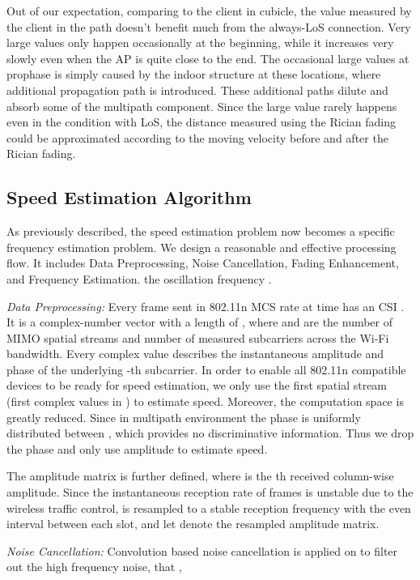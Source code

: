 Out of our expectation, comparing to the client in cubicle, the  value
 measured by the client in the path doesn't benefit much from the
 always-LoS connection.
Very large  values only happen occasionally at the
 beginning, while it increases very slowly even when the AP is quite
 close to the end.
The occasional large values  at prophase is simply caused by the indoor
structure at these locations, where additional propagation path is
introduced. These additional paths dilute and absorb some of the
multipath component.
Since the large value   rarely happens even in the condition with
LoS, the distance measured using the Rician fading could be approximated
according to the moving velocity before and after the Rician fading.

 


\subsection{Speed Estimation Algorithm}

As previously described, the speed estimation problem now becomes a
specific frequency estimation problem. We design a reasonable and effective
processing flow.  It includes Data Preprocessing, Noise Cancellation, Fading Enhancement, and Frequency Estimation.
the oscillation frequency .


\textit{Data Preprocessing:}
Every frame sent in 802.11n MCS rate at time  has an CSI . It
is a complex-number vector with a length of ,
where  and  are the number of MIMO spatial streams and
number of measured subcarriers across the Wi-Fi bandwidth. Every
complex value  describes the instantaneous amplitude
 and phase  of the underlying -th subcarrier.
In order to enable all 802.11n compatible devices to be ready for
speed estimation, we only use the first  spatial stream (first
 complex values in ) to estimate speed. Moreover, the
computation space is greatly reduced.
Since in multipath environment the phase  is uniformly
distributed between \cite{rappaport1996wireless}, which
provides no discriminative information.
Thus we drop the phase 
and only use amplitude  to estimate speed.

The amplitude matrix  is further
defined, where  is the th received column-wise
amplitude. Since the instantaneous reception rate of frames is
unstable due to the wireless traffic control,  is resampled
to a stable reception frequency  with the even interval between
each slot, and let  denote the resampled amplitude
matrix.


\textit{Noise Cancellation:}
Convolution based noise cancellation is applied on 
to filter out the high frequency noise, that
,

